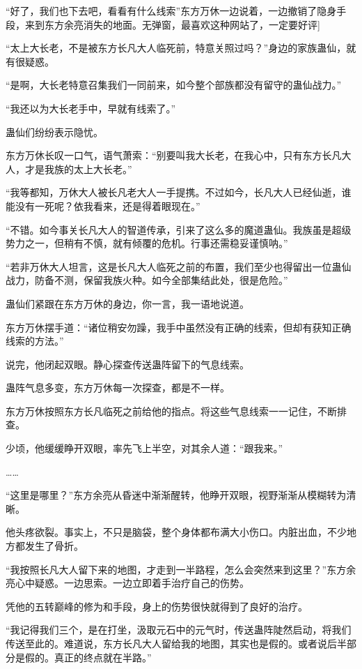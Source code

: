 
\begin{this_body}

“好了，我们也下去吧，看看有什么线索”东方万休一边说着，一边撤销了隐身手段，来到东方余亮消失的地面。无弹窗，最喜欢这种网站了，一定要好评]

“太上大长老，不是被东方长凡大人临死前，特意关照过吗？”身边的家族蛊仙，就有很疑惑。

“是啊，大长老特意召集我们一同前来，如今整个部族都没有留守的蛊仙战力。”

“我还以为大长老手中，早就有线索了。”

蛊仙们纷纷表示隐忧。

东方万休长叹一口气，语气萧索：“别要叫我大长老，在我心中，只有东方长凡大人，才是我族的太上大长老。”

“我等都知，万休大人被长凡老大人一手提携。不过如今，长凡大人已经仙逝，谁能没有一死呢？依我看来，还是得着眼现在。”

“不错。如今事关长凡大人的智道传承，引来了这么多的魔道蛊仙。我族虽是超级势力之一，但稍有不慎，就有倾覆的危机。行事还需稳妥谨慎呐。”

“若非万休大人坦言，这是长凡大人临死之前的布置，我们至少也得留出一位蛊仙战力，防备不测，保留我族火种。如今全部集结此处，很是危险。”

蛊仙们紧跟在东方万休的身边，你一言，我一语地说道。

东方万休摆手道：“诸位稍安勿躁，我手中虽然没有正确的线索，但却有获知正确线索的方法。”

说完，他闭起双眼。静心探查传送蛊阵留下的气息线索。

蛊阵气息多变，东方万休每一次探查，都是不一样。

东方万休按照东方长凡临死之前给他的指点。将这些气息线索一一记住，不断排查。

少顷，他缓缓睁开双眼，率先飞上半空，对其余人道：“跟我来。”

……

“这里是哪里？”东方余亮从昏迷中渐渐醒转，他睁开双眼，视野渐渐从模糊转为清晰。

他头疼欲裂。事实上，不只是脑袋，整个身体都布满大小伤口。内脏出血，不少地方都发生了骨折。

“我按照长凡大人留下来的地图，才走到一半路程，怎么会突然来到这里？”东方余亮心中疑惑。一边思索。一边立即着手治疗自己的伤势。

凭他的五转巅峰的修为和手段，身上的伤势很快就得到了良好的治疗。

“我记得我们三个，是在打坐，汲取元石中的元气时，传送蛊阵陡然启动，将我们传送至此的。难道说，东方长凡大人留给我的地图，其实也是假的。或者说后半部分是假的。真正的终点就在半路。”


\end{this_body}
